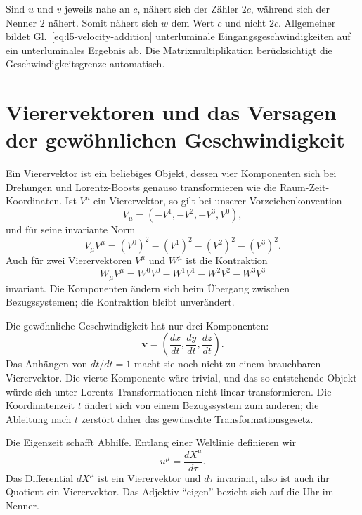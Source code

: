 Sind \(u\) und \(v\) jeweils nahe an \(c\), nähert sich der Zähler \(2c\), während sich der Nenner \(2\) nähert. Somit nähert sich \(w\) dem Wert \(c\) und nicht \(2c\). Allgemeiner bildet Gl.~\eqref{eq:l5-velocity-addition} unterluminale Eingangsgeschwindigkeiten auf ein unterluminales Ergebnis ab. Die Matrixmultiplikation berücksichtigt die Geschwindigkeitsgrenze automatisch.

\section{Vierervektoren und das Versagen der gewöhnlichen Geschwindigkeit}

Ein Vierervektor ist ein beliebiges Objekt, dessen vier Komponenten sich bei Drehungen und Lorentz-Boosts genauso transformieren wie die Raum-Zeit-Koordinaten. Ist \(V^\mu\) ein Vierervektor, so gilt bei unserer Vorzeichenkonvention
\begin{equation}
V_\mu=(-V^1,-V^2,-V^3,V^0),
\end{equation}
und für seine invariante Norm
\begin{equation}
V_\mu V^\mu=(V^0)^2-(V^1)^2-(V^2)^2-(V^3)^2.
\end{equation}
Auch für zwei Vierervektoren \(V^\mu\) und \(W^\mu\) ist die Kontraktion
\begin{equation}
W_\mu V^\mu
=W^0V^0-W^1V^1-W^2V^2-W^3V^3
\end{equation}
invariant. Die Komponenten ändern sich beim Übergang zwischen Bezugssystemen; die Kontraktion bleibt unverändert.

Die gewöhnliche Geschwindigkeit hat nur drei Komponenten:
\begin{equation}
\mathbf v=\left(\frac{dx}{dt},\frac{dy}{dt},\frac{dz}{dt}\right).
\end{equation}
Das Anhängen von \(dt/dt=1\) macht sie noch nicht zu einem brauchbaren Vierervektor. Die vierte Komponente wäre trivial, und das so entstehende Objekt würde sich unter Lorentz-Transformationen nicht linear transformieren. Die Koordinatenzeit \(t\) ändert sich von einem Bezugssystem zum anderen; die Ableitung nach \(t\) zerstört daher das gewünschte Transformationsgesetz.

Die Eigenzeit schafft Abhilfe. Entlang einer Weltlinie definieren wir
\begin{equation}
u^\mu=\frac{dX^\mu}{d\tau}.
\label{eq:l5-four-velocity}
\end{equation}
Das Differential \(dX^\mu\) ist ein Vierervektor und \(d\tau\) invariant, also ist auch ihr Quotient ein Vierervektor. Das Adjektiv ``eigen'' bezieht sich auf die Uhr im Nenner.

